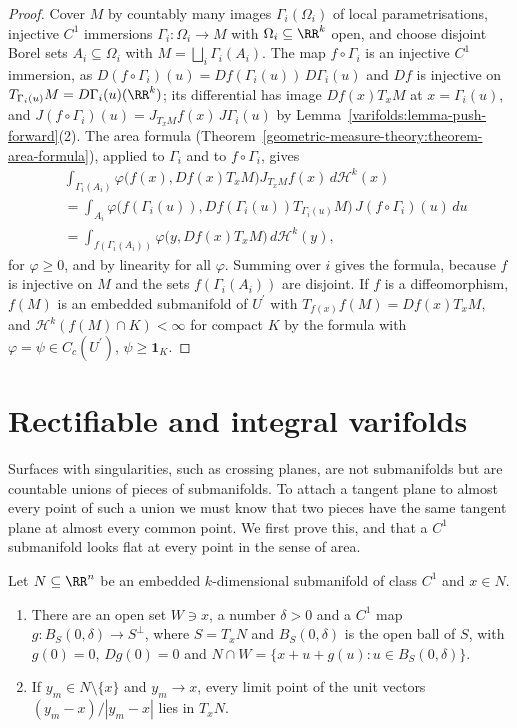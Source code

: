 \begin{proof}
Cover $M$ by countably many images $\Gamma_i(\Omega_i)$ of local parametrisations, injective $C^1$ immersions $\Gamma_i \colon \Omega_i \to M$ with $\Omega_i \subseteq \RR^k$ open, and choose disjoint Borel sets
$A_i \subseteq \Omega_i$ with $M = \bigsqcup_i\Gamma_i(A_i)$. The map $f \circ \Gamma_i$ is an injective $C^1$ immersion, as $D(f \circ \Gamma_i)(u) = Df(\Gamma_i(u))\,D\Gamma_i(u)$ and $Df$ is injective on
$T_{\Gamma_i(u)}M = D\Gamma_i(u)(\RR^k)$; its differential has image $Df(x)T_xM$ at $x = \Gamma_i(u)$, and $J(f \circ \Gamma_i)(u) = J_{T_xM}f(x)\,J\Gamma_i(u)$ by
Lemma~\ref{varifolds:lemma-push-forward}(2). The area formula (Theorem~\ref{geometric-measure-theory:theorem-area-formula}), applied to $\Gamma_i$ and to $f \circ \Gamma_i$, gives
\[
\begin{aligned}
&\int_{\Gamma_i(A_i)}\varphi\bigl(f(x), Df(x)T_xM\bigr)J_{T_xM}f(x)\,d\mathcal{H}^k(x) \\
&= \int_{A_i}\varphi\bigl(f(\Gamma_i(u)), Df(\Gamma_i(u))T_{\Gamma_i(u)}M\bigr)\,J(f \circ \Gamma_i)(u)\,du \\
&= \int_{f(\Gamma_i(A_i))}\varphi\bigl(y, Df(x)T_xM\bigr)\,d\mathcal{H}^k(y),
\end{aligned}
\]
for $\varphi \geq 0$, and by linearity for all $\varphi$. Summing over $i$ gives the formula, because $f$ is injective on $M$ and the sets $f(\Gamma_i(A_i))$ are disjoint. If $f$ is a diffeomorphism, $f(M)$ is an
embedded submanifold of $U^{\prime}$ with $T_{f(x)}f(M) = Df(x)T_xM$, and $\mathcal{H}^k(f(M) \cap K) < \infty$ for compact $K$ by the formula with $\varphi = \psi \in C_c(U^{\prime})$, $\psi \geq \mathbf{1}_K$.
\end{proof}

\section{Rectifiable and integral varifolds}\label{varifolds:section-rectifiable}

Surfaces with singularities, such as crossing planes, are not submanifolds but are countable unions of pieces of submanifolds. To attach a tangent plane to almost every point of such a union we must know
that two pieces have the same tangent plane at almost every common point. We first prove this, and that a $C^1$ submanifold looks flat at every point in the sense of area.

\begin{lemma}\label{varifolds:lemma-secant}
Let $N \subseteq \RR^n$ be an embedded $k$-dimensional submanifold of class $C^1$ and $x \in N$.
\begin{enumerate}
\item There are an open set $W \ni x$, a number $\delta > 0$ and a $C^1$ map $g \colon B_S(0, \delta) \to S^\perp$, where $S = T_xN$ and $B_S(0, \delta)$ is the open ball of $S$, with $g(0) = 0$, $Dg(0) = 0$
and $N \cap W = \{x + u + g(u) : u \in B_S(0, \delta)\}$.
\item If $y_m \in N \setminus \{x\}$ and $y_m \to x$, every limit point of the unit vectors $(y_m - x)/|y_m - x|$ lies in $T_xN$.
\end{enumerate}
\end{lemma}

